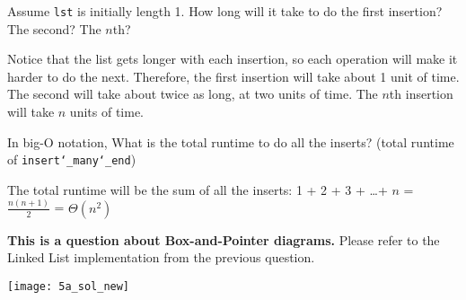 \documentclass{exam}
\begin{document}
\begin{questions}
\begin{blocksection}
\begin{parts}
\begin{subparts}
\subpart Assume \texttt{lst} is initially length 1. How long will it take to do
the first insertion? The second? The $n$th?
\begin{solution}[0.25in]
Notice that the list gets longer with each insertion, so each operation will
make it harder to do the next.
Therefore, the first insertion will take about 1 unit of time. The second will
take about twice as long, at two units of time. The $n$th insertion will take
$n$ units of time.
\end{solution}

\subpart In big-O notation, What is the total runtime to do all the inserts?
(total runtime of \texttt{insert\char`_many\char`_end})
\begin{solution}[0.25in]
The total runtime will be the sum of all the inserts: 1 + 2 + 3 + \ldots + $n$ =
$\frac{n (n + 1)}{2}$ = $\Theta(n^{2})$
\end{solution}

\end{subparts}

\end{parts}
\end{blocksection}

\begin{blocksection}

\question \textbf{This is a question about Box-and-Pointer diagrams.} Please refer to the Linked List implementation from the previous question.

\end{blocksection}
\begin{blocksection}
\begin{solution}[0.25in]
\begin{center}
\texttt{[image: 5a\_sol\_new]}
\end{center}
\end{solution}
\end{blocksection}




\end{questions}

\end{document}
